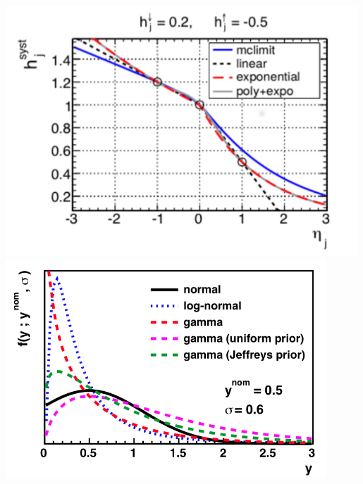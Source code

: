 \begin{frame}
\begin{columns}
\begin{column}{0.3\textwidth}
\includegraphics[width=0.99\textwidth]{Figures/Stat/cFunctionsInterExtrap_cropped3.pdf}\\
\vspace*{-0.3cm}
\includegraphics[width=0.9\textwidth]{Figures/Stat/plotNormalLogNGamma_cropped.png}
\end{column}
\end{columns}



\end{frame}
